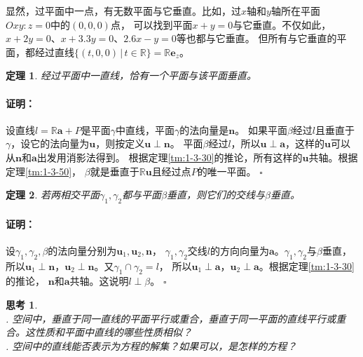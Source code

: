 \documentclass[12pt,UTF8]{ctexbook}
\newtheorem{tm}{定理}[section]
\renewenvironment{proof}{\paragraph{\textbf{证明：}}}{\hfill$\square$}
\newtheorem{sk}{思考}[section]
\begin{document}
显然，过平面中一点，有无数平面与它垂直。比如，过$x$轴和$y$轴所在平面$Oxy: z = 0$中的$(0,0,0)$点，
可以找到平面$x + y = 0$与它垂直。不仅如此，$x + 2y = 0$、$x + 3.3y = 0$、$2.6x - y = 0$等也都与它垂直。
但所有与它垂直的平面，都经过直线$\{(t,0,0) \, | \, t\in \mathbb{R}\} = \mathbb{R}\mathbf{e}_z$。
\begin{tm}
    经过平面中一直线，恰有一个平面与该平面垂直。    
\end{tm}
\begin{proof}
    设直线$l = \mathbb{R}\mathbf{a} + P$是平面$\gamma$中直线，平面$\gamma$的法向量是$\mathbf{n}$。
    如果平面$\beta$经过$l$且垂直于$\gamma$，设它的法向量为$\mathbf{u}$，则按定义$\mathbf{u}\perp\mathbf{n}$。
    平面$\beta$经过$l$，所以$\mathbf{u}\perp\mathbf{a}$，这样的$\mathbf{u}$可以从$\mathbf{n}$和$\mathbf{a}$出发用消影法得到。
    根据定理\ref{tm:1-3-30}的推论，所有这样的$\mathbf{u}$共轴。根据定理\ref{tm:1-3-50}，
    $\beta$就是垂直于$\mathbb{R}\mathbf{u}$且经过点$P$的唯一平面。
\end{proof}
\begin{tm}
    若两相交平面$\gamma_1,\gamma_2$都与平面$\beta$垂直，则它们的交线与$\beta$垂直。
\end{tm}
\begin{proof}
    设$\gamma_1,\gamma_2,\beta$的法向量分别为$\mathbf{u}_1,\mathbf{u}_2,\mathbf{n}$，
    $\gamma_1,\gamma_2$交线$l$的方向向量为$\mathbf{a}$。$\gamma_1,\gamma_2$与$\beta$垂直，
    所以$\mathbf{u}_1\perp\mathbf{n}$，$\mathbf{u}_2\perp\mathbf{n}$。又$\gamma_1\cap\gamma_2=l$，
    所以$\mathbf{u}_1\perp\mathbf{a}$，$\mathbf{u}_2\perp\mathbf{a}$。根据定理\ref{tm:1-3-30}的推论，
    $\mathbf{n}$和$\mathbf{a}$共轴。这说明$l\perp\beta$。
\end{proof}

\begin{sk}
    \mbox{} \\
    . 空间中，垂直于同一直线的平面平行或重合，垂直于同一平面的直线平行或重合。这性质和平面中直线的哪些性质相似？\\
    . 空间中的直线能否表示为方程的解集？如果可以，是怎样的方程？
\end{sk}
\end{document}
